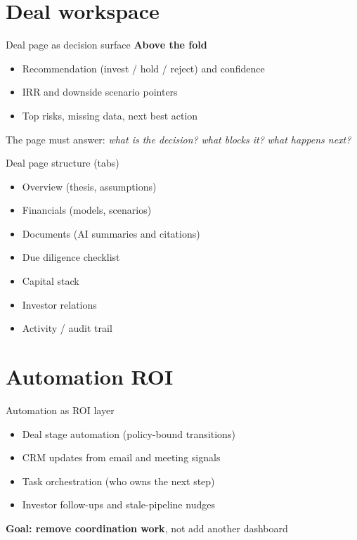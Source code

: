 \documentclass[aspectratio=169,11pt]{beamer}
\begin{document}
\section{Deal workspace}

\begin{frame}{Deal page as decision surface}
  \small
  \textbf{Above the fold}
  \begin{itemize}
    \item Recommendation (invest / hold / reject) and confidence
    \item IRR and downside scenario pointers
    \item Top risks, missing data, next best action
  \end{itemize}
  The page must answer: \textit{what is the decision?} \textit{what blocks it?} \textit{what happens next?}
\end{frame}

\begin{frame}{Deal page structure (tabs)}
  \small
  \begin{itemize}
    \item Overview (thesis, assumptions)
    \item Financials (models, scenarios)
    \item Documents (AI summaries and citations)
    \item Due diligence checklist
    \item Capital stack
    \item Investor relations
    \item Activity / audit trail
  \end{itemize}
\end{frame}

\section{Automation ROI}

\begin{frame}{Automation as ROI layer}
  \small
  \begin{itemize}
    \item Deal stage automation (policy-bound transitions)
    \item CRM updates from email and meeting signals
    \item Task orchestration (who owns the next step)
    \item Investor follow-ups and stale-pipeline nudges
  \end{itemize}
  \vspace{0.5em}
  \centering
  \textbf{Goal: remove coordination work}, not add another dashboard
\end{frame}
\end{document}
